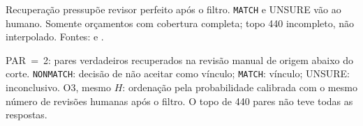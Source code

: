 \begin{table}[!htbp]
\centering\scriptsize
\caption{Filtro LLM de \texttt{NONMATCH} antes do revisor humano: análise exploratória. $k$ é a fila submetida ao LLM, não a carga humana $H$.}
\label{tab:cap8-filtro-llm}
\par\smallskip\parbox{\linewidth}{\footnotesize Recuperação pressupõe revisor perfeito após o filtro. \texttt{MATCH} e UNSURE vão ao humano. Somente orçamentos com cobertura completa; topo 440 incompleto, não interpolado. Fontes:  e .}
\par\footnotesize PAR~=~2: pares verdadeiros recuperados na revisão manual de origem abaixo do corte. \texttt{NONMATCH}: decisão de não aceitar como vínculo; \texttt{MATCH}: vínculo; UNSURE: inconclusivo. O3, mesmo $H$: ordenação pela probabilidade calibrada com o mesmo número de revisões humanas após o filtro. O topo de 440 pares não teve todas as respostas.
\end{table}
